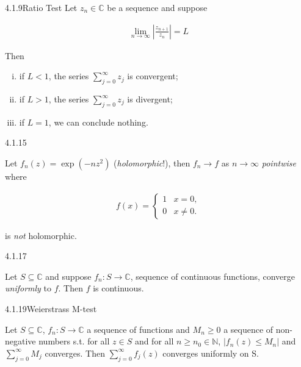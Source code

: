 \documentclass[10pt,landscape]{article}
\begin{document}
\begin{multicols}{3}
\begin{lemma}{4.1.9}{Ratio Test}
    Let $z_n \in \mathbb{C}$ be a sequence and suppose

        \begin{align*}
            \lim_{n \to \infty} \left| \frac{z_{n+1}}{z_n} \right| = L
        \end{align*}

    Then

        \begin{enumerate}[(i)]
            \setlength{\parskip}{0em}
            \item if $L < 1$, the series $\sum_{j=0}^{\infty}z_j$ is convergent;
            \item if $L > 1$, the series $\sum_{j=0}^{\infty}z_j$ is divergent;
            \item if $L = 1$, we can conclude nothing.
        \end{enumerate}

\end{lemma}

\begin{example}{4.1.15}{}

    Let $f_n(z) = \exp{(-nz^2)}$ (\emph{holomorphic}!), then $f_n \to f$ as $n \to \infty$ \emph{pointwise} where

        \begin{align*}
            f(x) =
            \begin{cases}
                1 & x = 0, \\
                0 & x \neq 0.
            \end{cases}
        \end{align*}

    is \emph{not} holomorphic.

\end{example}

\begin{lemma}{4.1.17}{}
    
    Let $S \subseteq \mathbb{C}$ and suppose $f_n: S \to \mathbb{C}$, sequence of continuous functions, converge \emph{uniformly} to $f$. Then $f$ is continuous. 

\end{lemma}

\begin{lemma}{4.1.19}{Weierstrass M-test}

    Let $S \subseteq \mathbb{C}$, $f_n: S \to \mathbb{C}$ a sequence of functions and $M_n \ge 0$ a sequence of non-negative numbers s.t. for all $z \in S$ and for all $n \ge n_0 \in \mathbb{N}$, $|f_n(z) \le M_n|$ and $\sum_{j=0}^{\infty} M_j$ converges. Then $\sum_{j=0}^{\infty} f_j(z)$ converges uniformly on S.


\end{lemma}
\end{multicols}
\end{document}
